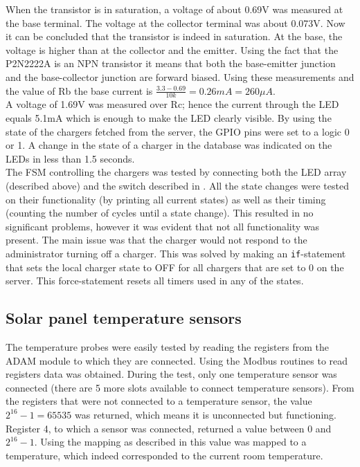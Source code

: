 When the transistor is in saturation, a voltage of about 0.69V was measured at the base terminal. The voltage at the collector terminal was about 0.073V. Now it can be concluded that the transistor is indeed in saturation. At the base, the voltage is higher than at the collector and the emitter. Using the fact that the P2N2222A is an NPN transistor it means that both the base-emitter junction and the base-collector junction are forward biased. Using these measurements and the value of Rb the base current is $\frac{3.3-0.69}{10k}=0.26mA=260\mu A$.\\

A voltage of 1.69V was measured over Rc; hence the current through the LED equals 5.1mA which is enough to make the LED clearly visible. By using the state of the chargers fetched from the server, the GPIO pins were set to a logic 0 or 1. A change in the state of a charger in the database was indicated on the LEDs in less than 1.5 seconds.\\

The FSM controlling the chargers was tested by connecting both the LED array (described above) and the switch described in . All the state changes were tested on their functionality (by printing all current states) as well as their timing (counting the number of cycles until a state change). This resulted in no significant problems, however it was evident that not all functionality was present. The main issue was that the charger would not respond to the administrator turning off a charger. This was solved by making an \verb|if|-statement that sets the local charger state to OFF for all chargers that are set to 0 on the server. This force-statement resets all timers used in any of the states.

\subsection{Solar panel temperature sensors}
The temperature probes were easily tested by reading the registers from the ADAM module to which they are connected. Using the Modbus routines to read registers data was obtained. During the test, only one temperature sensor was connected (there are 5 more slots available to connect temperature sensors). From the registers that were not connected to a temperature sensor, the value $2^{16}-1=65535$ was returned, which means it is unconnected but functioning. Register 4, to which a sensor was connected, returned a value between $0$ and $2^{16}-1$. Using the mapping as described in  this value was mapped to a temperature, which indeed corresponded to the current room temperature.

